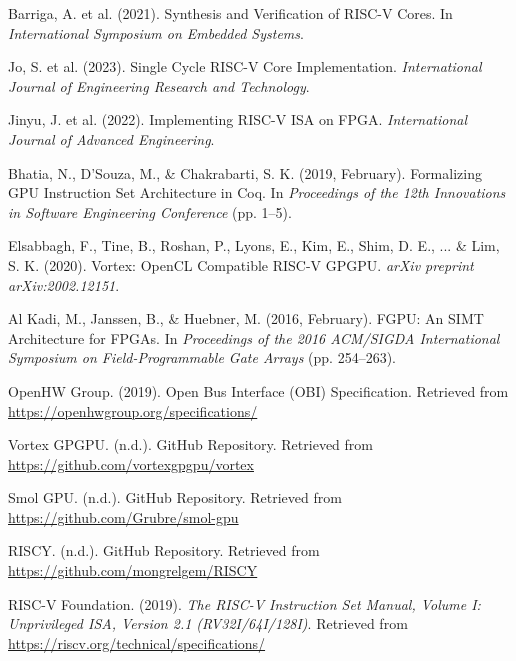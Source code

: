\documentclass[conference]{IEEEtran}
\begin{document}
\begin{thebibliography}{00}
 Barriga, A. et al. (2021). Synthesis and Verification of RISC-V Cores. In \textit{International Symposium on Embedded Systems}.

 Jo, S. et al. (2023). Single Cycle RISC-V Core Implementation. \textit{International Journal of Engineering Research and Technology}.

 Jinyu, J. et al. (2022). Implementing RISC-V ISA on FPGA. \textit{International Journal of Advanced Engineering}.

 Bhatia, N., D’Souza, M., \& Chakrabarti, S. K. (2019, February). Formalizing GPU Instruction Set Architecture in Coq. In \textit{Proceedings of the 12th Innovations in Software Engineering Conference} (pp. 1–5).

 Elsabbagh, F., Tine, B., Roshan, P., Lyons, E., Kim, E., Shim, D. E., ... \& Lim, S. K. (2020). Vortex: OpenCL Compatible RISC-V GPGPU. \textit{arXiv preprint arXiv:2002.12151}.

 Al Kadi, M., Janssen, B., \& Huebner, M. (2016, February). FGPU: An SIMT Architecture for FPGAs. In \textit{Proceedings of the 2016 ACM/SIGDA International Symposium on Field-Programmable Gate Arrays} (pp. 254–263).

 OpenHW Group. (2019). Open Bus Interface (OBI) Specification. Retrieved from \url{https://openhwgroup.org/specifications/}

 Vortex GPGPU. (n.d.). GitHub Repository. Retrieved from \url{https://github.com/vortexgpgpu/vortex}

 Smol GPU. (n.d.). GitHub Repository. Retrieved from \url{https://github.com/Grubre/smol-gpu}

 RISCY. (n.d.). GitHub Repository. Retrieved from \url{https://github.com/mongrelgem/RISCY}

 RISC-V Foundation. (2019). \textit{The RISC-V Instruction Set Manual, Volume I: Unprivileged ISA, Version 2.1 (RV32I/64I/128I)}. Retrieved from \url{https://riscv.org/technical/specifications/}

\end{thebibliography}
\end{document}
